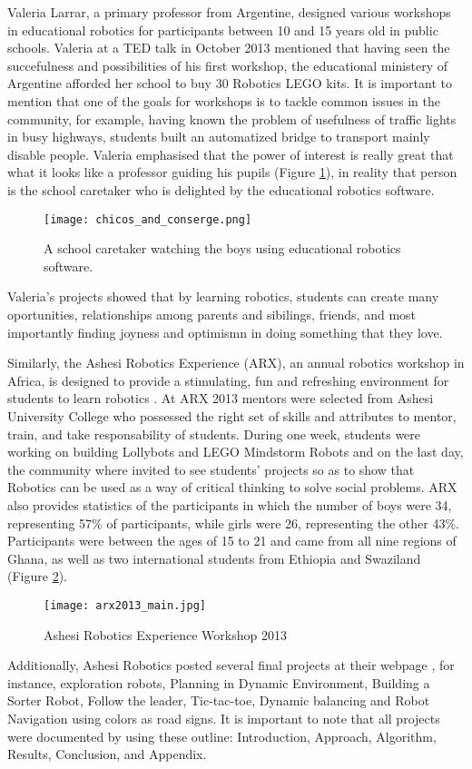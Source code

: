 Valeria Larrar, a primary professor from Argentine, designed various workshops in educational 
robotics for participants between 10 and 15 years old in public schools. Valeria at a TED 
talk \cite{Larrart2013} in October 2013 mentioned that having seen the succefulness and 
possibilities of his first workshop, the educational ministery of Argentine afforded her 
school to buy 30 Robotics LEGO kits. It is important to mention that one of the goals 
for workshops is to tackle common issues in the community, for example, having known 
the problem of usefulness of traffic lights in busy highways, students built an 
automatized bridge to transport mainly disable people. Valeria emphasised that the power 
of interest is really great that what it looks like a professor guiding his pupils 
(Figure \ref{fig:educationalroboticsprojects}), in reality that person is the school 
caretaker who is delighted by the educational robotics software.
\begin{figure}[htbp!] 
\centering    
\texttt{[image: chicos\_and\_conserge.png]}
\caption[PA]{A school caretaker watching the boys using educational robotics software.}
\label{fig:educationalroboticsprojects}
\end{figure}
Valeria's projects showed that by learning robotics, students can create many 
oportunities, relationships among parents and sibilings, friends, and most importantly
finding joyness and optimismn in doing something that they love.

Similarly, the Ashesi Robotics Experience (ARX), an annual robotics workshop in Africa,
is designed to provide a stimulating, fun and refreshing environment 
for students to learn robotics \cite{ARX2013}. At ARX 2013 mentors were selected
from Ashesi University College who possessed the right set of skills and attributes 
to mentor, train, and take responsability of students. During one week, students 
were working on building Lollybots and LEGO Mindstorm Robots and 
on the last day, the community where invited to see students' projects 
so as to show that Robotics can be used as a way of critical thinking to solve social 
problems.
ARX also provides statistics of the participants in which the number of boys were 34, 
representing 57\% of participants, while girls were 26, representing the other 43\%. 
Participants were between the ages of 15 to 21 and came from all nine regions of Ghana, 
as well as two international students from Ethiopia and Swaziland 
(Figure \ref{fig:arx2013}).
\begin{figure}[htbp!] 
\centering    
\texttt{[image: arx2013\_main.jpg]}
\caption[PA]{Ashesi Robotics Experience Workshop 2013}
\label{fig:arx2013}
\end{figure}
Additionally, Ashesi Robotics posted several final projects at their webpage 
\cite{ashesirobotics2013}, for instance, exploration robots,
Planning in Dynamic Environment, Building a Sorter Robot, Follow the leader,
Tic-tac-toe, Dynamic balancing and Robot Navigation using colors as road signs.
It is important to note that all projects were documented by using 
these outline: Introduction, Approach, Algorithm, Results, Conclusion, and Appendix.

